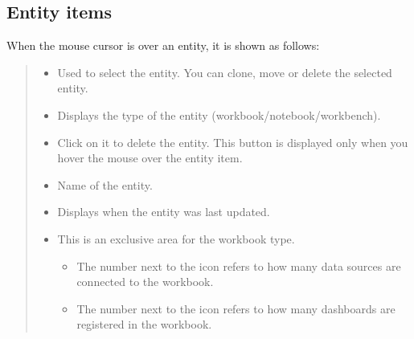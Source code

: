 \documentclass[letterpaper,10pt,english]{sphinxmanual}
\begin{document}
\subsection{Entity items}
\label{\detokenize{discovery/part03/workspace_management:items}}\label{\detokenize{discovery/part03/workspace_management:id4}}
When the mouse cursor is over an entity, it is shown as follows:
\begin{quote}

\begin{figure}[H]
\centering

\noindent{}
\end{figure}
\begin{itemize}
\item {} 
 Used to select the entity. You can clone, move or delete the selected entity.

\item {} 
 Displays the type of the entity (workbook/notebook/workbench).

\item {} 
 Click on it to delete the entity. This button is displayed only when you hover the mouse over the entity item.

\item {} 
 Name of the entity.

\item {} 
 Displays when the entity was last updated.

\item {} 
 This is an exclusive area for the workbook type.
\begin{itemize}
\item {} 
The number next to the  icon refers to how many data sources are connected to the workbook.

\item {} 
The number next to the  icon refers to how many dashboards are registered in the workbook.

\end{itemize}

\end{itemize}
\end{quote}
\end{document}
